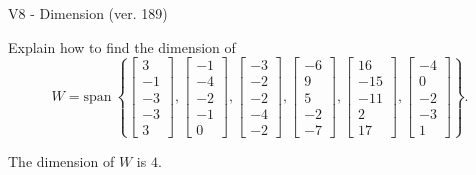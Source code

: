 \begin{exercise}
  \begin{exerciseTitle}V8 - Dimension (ver. 189)\end{exerciseTitle}
  \begin{exerciseStatement}
    Explain how to find the dimension of 
\[W=\mathrm{span}\ \left\{\left[\begin{array}{r}
3 \\
-1 \\
-3 \\
-3 \\
3
\end{array}\right] , \left[\begin{array}{r}
-1 \\
-4 \\
-2 \\
-1 \\
0
\end{array}\right] , \left[\begin{array}{r}
-3 \\
-2 \\
-2 \\
-4 \\
-2
\end{array}\right] , \left[\begin{array}{r}
-6 \\
9 \\
5 \\
-2 \\
-7
\end{array}\right] , \left[\begin{array}{r}
16 \\
-15 \\
-11 \\
2 \\
17
\end{array}\right] , \left[\begin{array}{r}
-4 \\
0 \\
-2 \\
-3 \\
1
\end{array}\right]\right\}.\]



  \end{exerciseStatement}
  \begin{exerciseAnswer}
   The dimension of \(W\) is  \(4\).
  


  \end{exerciseAnswer}
\end{exercise}
